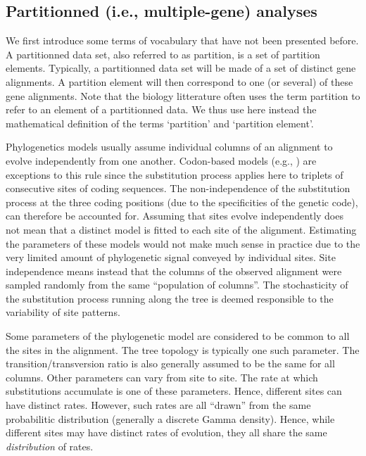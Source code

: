 \documentclass[a4paper,12pt]{article}
\begin{document}
\subsection{Partitionned (i.e., multiple-gene) analyses}

We first introduce some terms of vocabulary that have not been presented before. A partitionned data
set, also referred to as partition, is a  set of partition elements.  Typically, a partitionned data
set will be made of  a set of distinct gene alignments. A partition  element will then correspond to
one (or  several) of these gene  alignments. Note that the  biology litterature often uses  the term
partition to refer to an element of a  partitionned data.  We thus use here instead the mathematical
definition of the terms `partition' and `partition element'.

Phylogenetics models usually assume individual columns  of an alignment to evolve independently from
one  another. Codon-based  models (e.g.,  \cite{yang98,yang00b,yang02,guindon04}) are  exceptions to
this rule  since the substitution process  applies here to  triplets of consecutive sites  of coding
sequences.  The non-independence of  the substitution process at the three  coding positions (due to
the specificities of the genetic code), can  therefore be accounted for.  Assuming that sites evolve
independently  does not  mean  that a  distinct  model is  fitted  to each  site  of the  alignment.
Estimating the  parameters of these  models would not  make much sense in  practice due to  the very
limited amount of phylogenetic signal conveyed by individual sites.  Site independence means instead
that the  columns of  the observed  alignment were sampled  randomly from  the same  ``population of
columns''.   The  stochasticity  of the  substitution  process  running  along  the tree  is  deemed
responsible to the variability of site patterns.

Some parameters  of the  phylogenetic model  are considered  to be common  to all  the sites  in the
alignment. The tree topology is typically  one such parameter.  The transition/transversion ratio is
also generally assumed to be the same for all columns.  Other parameters can vary from site to site.
The rate at  which substitutions accumulate is  one of these parameters. Hence,  different sites can
have distinct rates. However,  such rates are all ``drawn'' from  the same probabilitic distribution
(generally a  discrete Gamma  density).  Hence,  while different  sites may  have distinct  rates of
evolution, they all share the same {\em distribution} of rates.
\end{document}
